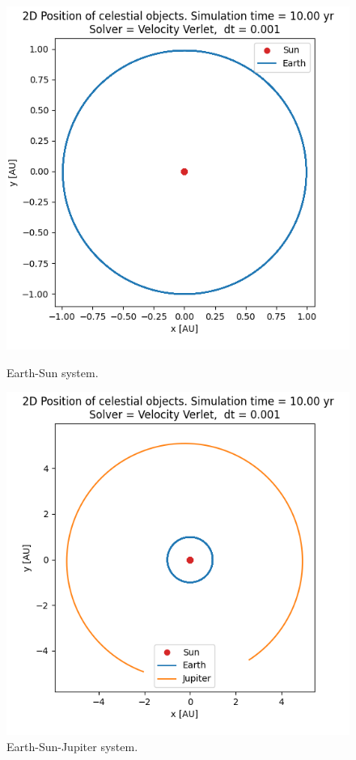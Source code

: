 \documentclass[american,a4paper,12pt]{article}
\begin{document}
\begin{figure}[H]
  \centering
  \begin{minipage}[b]{0.49\textwidth}
    \includegraphics[width=\textwidth]{figures/Earth.png}
    \caption{Earth-Sun system.}
    \label{fig:ES_eliptical}
  \end{minipage}
  \hfill
  \begin{minipage}[b]{0.49\textwidth}
    \includegraphics[width=\textwidth]{figures/Jupiter.png}
    \caption{Earth-Sun-Jupiter system.}
    \label{fig:ESJ_fixed}
  \end{minipage}
\end{figure}
\end{document}
